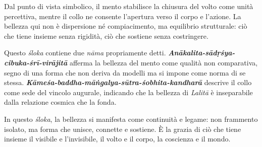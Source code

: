 Dal punto di vista simbolico, il mento stabilisce la chiusura del volto come unità percettiva, mentre il collo ne consente l’apertura verso il corpo e l’azione. La bellezza qui non è dispersione né compiacimento, ma equilibrio strutturale: ciò che tiene insieme senza rigidità, ciò che sostiene senza costringere.

Questo \textit{śloka} contiene due \textit{nāma} propriamente detti. \textbf{\textit{Anākalita-sādṛśya-cibuka-śrī-virājitā}} afferma la bellezza del mento come qualità non comparativa, segno di una forma che non deriva da modelli ma si impone come norma di se stessa. \textbf{\textit{Kāmeśa-baddha-māṅgalya-sūtra-śobhita-kandharā}} descrive il collo come sede del vincolo augurale, indicando che la bellezza di \textit{Lalitā} è inseparabile dalla relazione cosmica che la fonda.

In questo \textit{śloka}, la bellezza si manifesta come continuità e legame: non frammento isolato, ma forma che unisce, connette e sostiene. È la grazia di ciò che tiene insieme il visibile e l’invisibile, il volto e il corpo, la coscienza e il mondo.
